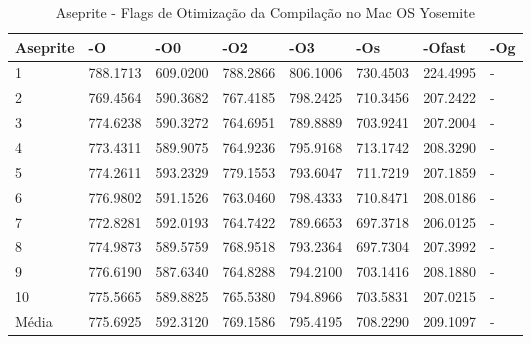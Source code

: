 \begin{table}[!ht]
\tiny
\centering
\caption{Aseprite - Flags de Otimização da Compilação no Mac OS Yosemite}
\label{tab:otimizacao_compilacao:mac:aseprite}
\begin{tabular}{llllllll}
\textbf{Aseprite} & \textbf{-O}  & \textbf{-O0}   & \textbf{-O2} & \textbf{-O3} & \textbf{-Os} & \textbf{-Ofast} & \textbf{-Og} \\ \toprule
1                 & 788.1713     &  609.0200      &  788.2866    & 806.1006     &  730.4503  &   224.4995        &  -           \\ 
2                 & 769.4564     &  590.3682      &  767.4185    & 798.2425     &  710.3456  &   207.2422        &  -           \\ 
3                 & 774.6238     &  590.3272      &  764.6951    & 789.8889     &  703.9241  &   207.2004        &  -           \\ 
4                 & 773.4311     &  589.9075      &  764.9236    & 795.9168     &  713.1742  &   208.3290        &  -           \\ 
5                 & 774.2611     &  593.2329      &  779.1553    & 793.6047     &  711.7219  &   207.1859        &  -           \\ 
6                 & 776.9802     &  591.1526      &  763.0460    & 798.4333     &  710.8471  &   208.0186        &  -           \\ 
7                 & 772.8281     &  592.0193      &  764.7422    & 789.6653     &  697.3718  &   206.0125        &  -           \\ 
8                 & 774.9873     &  589.5759      &  768.9518    & 793.2364     &  697.7304  &   207.3992        &  -           \\ 
9                 & 776.6190     &  587.6340      &  764.8288    & 794.2100     &  703.1416  &   208.1880        &  -           \\ 
10                & 775.5665     &  589.8825      &  765.5380    & 794.8966     &  703.5831  &   207.0215        &  -           \\ \bottomrule
Média             & 775.6925     &  592.3120      &  769.1586    & 795.4195     &  708.2290  &   209.1097        &  -           \\ 
\end{tabular}
\end{table}

